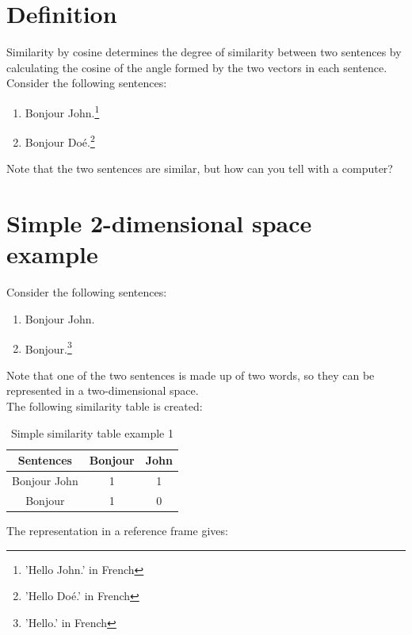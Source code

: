 \documentclass[a4paper, 14pt]{article}
\author{Tuo Ismaël Maurice}
\date{14/04/2025}
\begin{document}
	\section{Definition}
	Similarity by cosine determines the degree of similarity between two sentences by calculating the cosine of the angle formed by the two vectors in each sentence.\\
	Consider the following sentences:
	\begin{enumerate}
		\item Bonjour John.\footnote{'Hello John.' in French}
		\item Bonjour Doé.\footnote{'Hello Doé.' in French}
	\end{enumerate}
	Note that the two sentences are similar, but how can you tell with a computer?

	\section{Simple 2-dimensional space example}
	Consider the following sentences:
	\begin{enumerate}
		\item Bonjour John.
		\item Bonjour.\footnote{'Hello.' in French}
	\end{enumerate}
	Note that one of the two sentences is made up of two words, so they can be represented in a two-dimensional space.\\
	The following similarity table is created:
	\begin{table}[H]
		\centering
		\begin{tabular}{|c|c|c|}
			\hline
			\textbf{Sentences} & \textbf{Bonjour} & \textbf{John} \\
			\hline
			Bonjour John & 1 & 1 \\
			Bonjour & 1 & 0 \\
			\hline
		\end{tabular}
		\caption{Simple similarity table example 1}
		\label{tab:exemplesimple}
	\end{table}
	The representation in a reference frame gives:
\end{document}
